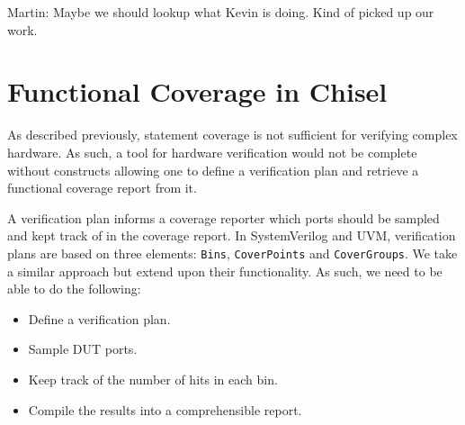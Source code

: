 \documentclass[conference]{IEEEtran}
\newcommand{\martin}[1]{{\color{blue} Martin: #1}}
\begin{document}

\martin{Maybe we should lookup what Kevin is doing. Kind of picked up our work.}

\section{Functional Coverage in Chisel}
As described previously, statement coverage is not sufficient for verifying complex hardware. As such, a tool for hardware verification would not be complete without constructs allowing one to define a verification plan and retrieve a functional coverage report from it. %

A verification plan informs a coverage reporter which ports should be sampled and kept track of in the coverage report. In SystemVerilog and UVM, verification plans are based on three elements: \texttt{Bins}, \texttt{CoverPoints} and \texttt{CoverGroups}. We take a similar approach but extend upon their functionality. As such, we need to be able to do the following: %
\begin{itemize}
\item Define a verification plan. %
\item Sample DUT ports.%
\item Keep track of the number of hits in each bin.%
\item Compile the results into a comprehensible report.%
\end{itemize}
\end{document}
